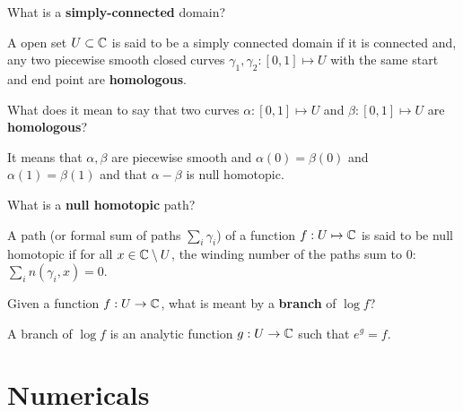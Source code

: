 \documentclass{homework}
\begin{document}
              \begin{problem}
                What is a \textbf{simply-connected} domain?
                \end{problem}
                \begin{solution}
                A open set $U\subset \mathbb{C}$ is said to be a simply connected domain if it is connected and, any two piecewise smooth closed curves $\gamma_1, \gamma_2: [0, 1]\mapsto U$ with the same start and end point are \textbf{homologous}.
                \end{solution}
                \begin{problem}
                  What does it mean to say that two curves $\alpha: [0, 1]\mapsto U$ and $\beta: [0, 1]\mapsto U$ are
                    \textbf{homologous}?
                    \end{problem}
                    \begin{solution}
                    It means that $\alpha, \beta$ are piecewise smooth and $\alpha(0) = \beta(0)$ and $\alpha(1) = \beta(1)$ and that $\alpha - \beta$ is null homotopic.
                    \end{solution}
                    \begin{problem}
                      What is a \textbf{null homotopic} path?
                      \end{problem}
                      \begin{solution}
                      A path (or formal sum of paths $\sum_{i} \gamma_i$) of a function $f: U \mapsto \mathbb{C}$ is said to be null homotopic if for all $x\in \mathbb{C} \setminus U$, the winding number of the paths sum to 0: $\sum_i n(\gamma_i, x) = 0.$
                      \end{solution}
                      \begin{problem}
                        Given a function $f : U \to \mathbb{C}$, what is meant by a \textbf{branch} of $\log f$?
                        \end{problem}
                        \begin{solution}
                        A branch of $\log f$ is an analytic function $g: U \to \mathbb{C}$ such that $e^g = f$.
                        \end{solution}

                        \section{Numericals}
\end{document}
